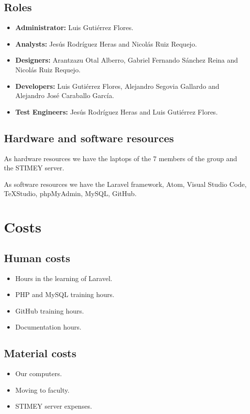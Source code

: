 \subsection{Roles}
\begin{itemize}
	\item \textbf{Administrator:} Luis Gutiérrez Flores.
	\item \textbf{Analysts:} Jesús Rodríguez Heras and Nicolás Ruiz Requejo.
	\item \textbf{Designers:} Arantzazu Otal Alberro, Gabriel Fernando Sánchez Reina and Nicolás Ruiz Requejo.
	\item \textbf{Developers:} Luis Gutiérrez Flores, Alejandro Segovia Gallardo and Alejandro José Caraballo García.
	\item \textbf{Test Engineers:} Jesús Rodríguez Heras and Luis Gutiérrez Flores.
\end{itemize}

\subsection{Hardware and software resources}
As hardware resources we have the laptops of the 7 members of the group and the STIMEY server.

As software resources we have the Laravel framework, Atom, Visual Studio Code, TeXStudio, phpMyAdmin, MySQL, GitHub.

\section{Costs}
\subsection{Human costs}
\begin{itemize}
	\item Hours in the learning of Laravel.
	\item PHP and MySQL training hours.
	\item GitHub training hours.
	\item Documentation hours.
\end{itemize}

\subsection{Material costs}
\begin{itemize}
	\item Our computers.
	\item Moving to faculty.
	\item STIMEY server expenses.
\end{itemize}

